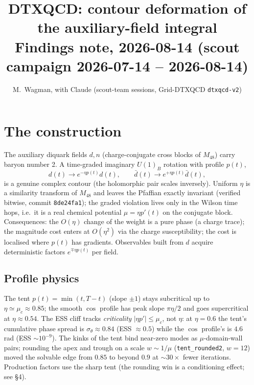 \documentclass[11pt]{article}
\title{DTXQCD: contour deformation of the auxiliary-field integral\\
\large Findings note, 2026-08-14 (scout campaign 2026-07-14 -- 2026-08-14)}
\author{M.~Wagman, with Claude (scout-team sessions, Grid-DTXQCD \texttt{dtxqcd-v2})}
\date{}
\begin{document}
\maketitle

\section{The construction}
The auxiliary diquark fields $d,n$ (charge-conjugate cross blocks of $M_{48}$) carry baryon
number 2.  A time-graded imaginary $U(1)_B$ rotation with profile $p(t)$,
\begin{equation}
  d(t)\to e^{-\eta p(t)}d(t),\qquad \bar d(t)\to e^{+\eta p(t)}\bar d(t),
\end{equation}
is a genuine complex contour (the holomorphic pair scales inversely).  Uniform $\eta$ is a
similarity transform of $M_{48}$ and leaves the Pfaffian exactly invariant (verified bitwise,
commit \texttt{8de24fa1}); the graded violation lives only in the Wilson time hops, i.e.\ it is a
real chemical potential $\mu=\eta p'(t)$ on the conjugate block.  Consequences: the $O(\eta)$
change of the weight is a pure phase (a charge trace); the magnitude cost enters at
$O(\eta^2)$ via the charge susceptibility; the cost is localised where $p(t)$ has gradients.
Observables built from $d$ acquire deterministic factors $e^{\mp\eta p(t)}$ per field.

\subsection{Profile physics}
The tent $p(t)=\min(t,T-t)$ (slope $\pm1$) stays subcritical up to $\eta\simeq\mu_c\approx0.85$;
the smooth $\cos$ profile has peak slope $\pi\eta/2$ and goes supercritical at $\eta\approx0.54$.
The ESS cliff tracks \emph{criticality} $|\eta p'|\le\mu_c$, not $\eta$: at $\eta=0.6$ the
tent's cumulative phase spread is $\sigma_\theta\approx0.84$ (ESS $\approx0.5$) while the
$\cos$ profile's is $4.6$ rad (ESS $\sim10^{-9}$).  The kinks of the tent bind near-zero modes
as $\mu$-domain-wall pairs; rounding the apex and trough on a scale $w\sim1/\mu$
(\texttt{tent\_rounded2}, $w=12$) moved the solvable edge from $0.85$ to beyond $0.9$ at
$\sim30\times$ fewer iterations.  Production factors use the sharp tent (the rounding win is
a conditioning effect; see \S4).
\end{document}
